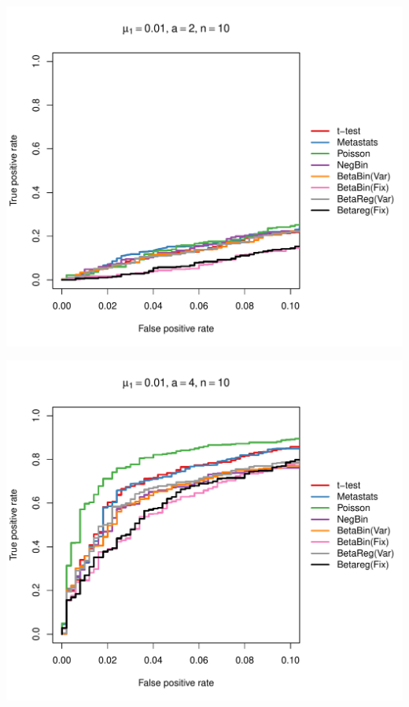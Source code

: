 \documentclass[12pt]{article}\usepackage{graphicx, color}
\makeatletter
\def\maxwidth{ %
  \ifdim\Gin@nat@width>\linewidth
    \linewidth
  \else
    \Gin@nat@width
  \fi
}
\newenvironment{knitrout}{}{} %
\makeatother
\begin{document}
\begin{knitrout}
{\centering \includegraphics[width=\maxwidth]{figure/rocs23} 

}




{\centering \includegraphics[width=\maxwidth]{figure/rocs24} 

}





\end{knitrout}
\end{document}
